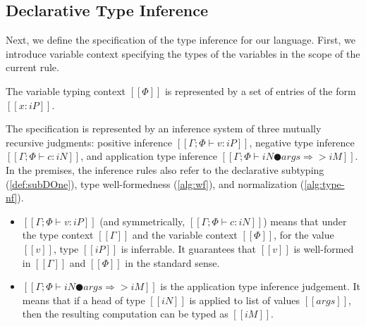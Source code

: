 \documentclass[a4,natbib=false]{article}
\begin{document}
\subsection{Declarative Type Inference}

Next, we define the specification of the type 
inference for our language. First, we introduce 
variable context specifying the types of the variables 
in the scope of the current rule. 

\begin{definition}
  The variable typing context $[[Φ]]$
  is represented by a set of entries of the form
  $[[x : iP]]$. 
\end{definition}

The specification is represented by an inference system of
three mutually recursive judgments:
positive inference $[[Γ ; Φ ⊢ v : iP]]$,
negative type inference $[[Γ ; Φ ⊢ c : iN]]$, and
application type inference $[[Γ ; Φ ⊢ iN ● args ⇒> iM ]]$.
In the premises, the inference rules also refer to 
the declarative subtyping (\cref{def:subDOne}),
type well-formedness (\cref{alg:wf}), 
and normalization (\cref{alg:type-nf}).
\begin{itemize}
  \item $[[Γ ; Φ ⊢ v : iP]]$ (and symmetrically, $[[Γ ; Φ ⊢ c : iN]]$)
    means that under the type context $[[Γ]]$ and
    the variable context $[[Φ]]$, for the value $[[v]]$,
    type $[[iP]]$ is inferrable. It guarantees that 
    $[[v]]$ is well-formed in $[[Γ]]$ and $[[Φ]]$ in
    the standard sense.
  \item $[[ Γ ; Φ ⊢ iN ● args ⇒> iM ]]$ is the application type inference 
    judgement. It means that if a head of type $[[iN]]$ 
    is applied to list of values $[[args]]$, 
    then the resulting computation can be typed as $[[iM]]$.
\end{itemize}

\begin{definition}
  \label{def:declarative-typing}
  \hfill
  \begin{multicols}{2}
  \ottdefnDTNInf{}
  \ottdefnDTPInf{}
  \ottdefnDTSpinInf{}
  \end{multicols}
\end{definition}
\end{document}
